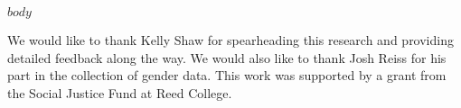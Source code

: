 \documentclass[sigconf]{acmart}
\begin{document}
\maketitle

$body$


\balance
\begin{acks}
We would like to thank Kelly Shaw for spearheading this research and providing detailed feedback along the way. We would also like to thank Josh Reiss for his part in the collection of gender data.
  This work was supported by a grant from the Social Justice Fund at Reed College.
\end{acks}

\clearpage{}


\end{document}
